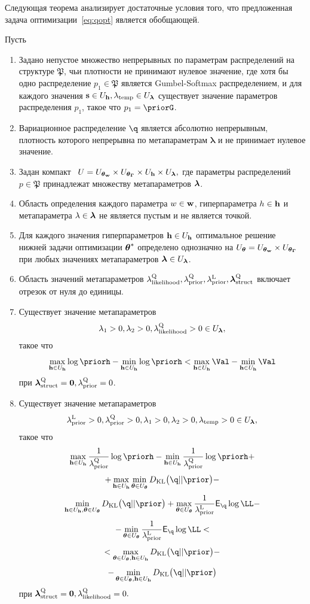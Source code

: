 Следующая теорема анализирует достаточные условия того, что предложенная задача оптимизации~\eqref{eq:qopt} является обобщающей.
\begin{theorem}
Пусть
\begin{enumerate}%
\item Задано непустое множество непрерывных по параметрам распределений на структуре $\mathfrak{P}$, чьи плотности не принимают нулевое значение, где хотя бы одно распределение $p_1 \in \mathfrak{P}$ является Gumbel-Softmax распределением, и для каждого значения $\mathbf{s} \in U_{\mathbf{h}}, \lambda_{\text{temp}} \in U_{\boldsymbol{\lambda}}$ существует значение параметров распределения $p_1$, такое что $p_1 = \priorG$.

\item Вариационное распределение $\q$ является  абсолютно непрерывным, плотность которого непрерывна по метапараметрам $\boldsymbol{\lambda}$ и не принимает нулевое значение.

\item Задан компакт  $U = U_{\boldsymbol{\theta}_\mathbf{w}} \times U_{\boldsymbol{\theta}_{\boldsymbol{\Gamma}}} \times U_{\mathbf{h}} \times U_{\boldsymbol{\lambda}},$ где параметры распределений $p \in \mathfrak{P}$ принадлежат множеству метапараметров $\boldsymbol{\lambda}$.

\item Область определения каждого параметра $w \in\mathbf{w}$, гиперпараметра $h \in \mathbf{h}$ и метапараметра $\lambda \in \boldsymbol{\lambda}$ не является пустым и не является точкой.

\item Для каждого значения гиперпараметров $\mathbf{h} \in U_{\mathbf{h}}$ оптимальное решение нижней задачи оптимизации $\boldsymbol{\theta}^{*}$ определено однозначно на $U_{\boldsymbol{\theta}} = U_{\boldsymbol{\theta}_\mathbf{w}} \times U_{\boldsymbol{\theta}_{\boldsymbol{\Gamma}}}$ при любых значениях метапараметров $\boldsymbol{\lambda} \in U_{\boldsymbol{\lambda}}$.

\item Область значений метапараметров $\lambda_\text{likelihood}^\text{Q}, \lambda_\text{prior}^\text{Q}, \lambda_\text{prior}^\text{L}, \boldsymbol{\lambda}_\text{struct}^\text{Q}$ включает отрезок от нуля до единицы.

\item Существует значение метапараметров $$\lambda_1>0, \lambda_2>0, \lambda_\text{likelihood}^\text{Q}>0  \in U_{\boldsymbol{\lambda}},$$ такое что
\[
\max_{\h \in \Uh} \log \priorh -\min_{\h \in \Uh}\log \priorh < \max_{\h \in \Uh} \Val - \min_{\h \in \Uh} \Val
\] 
при $\boldsymbol{\lambda}_\text{struct}^\text{Q} = \mathbf{0}, \lambda_\text{prior}^\text{Q} = 0$.

\item Существует значение метапараметров $$\lambda_\text{prior}^\text{L}>0, \lambda_\text{prior}^\text{Q}>0, \lambda_1>0, \lambda_2>0, \lambda_{\text{temp}}>0 \in U_{\boldsymbol{\lambda}},$$ такое что 
\[
    \max_{\h \in \Uh} \frac{1}{\lamCQ}\log  \priorh - \min_{\h \in \Uh} \frac{1}{\lamCQ}\log  \priorh +
\]
\[
 + \max_{\h \in \Uh} \min_{\teta \in \Uteta} \KL{\q}{\prior} -
\]
\[ \min_{\h \in \Uh, \teta \in \Uteta}  \KL{\q}{\prior} + \max_{\teta \in \Uteta}\frac{1}{\lamCL}\E_{\q} \log \LL - 
\]
\[
 - \min_{\teta \in \Uteta}\frac{1}{\lamCL}\E_{\q} \log \LL  <
\]
\[ 
< \max_{\teta \in \Uteta, \h \in \Uh} \KL{\q}{\prior} -
\]
\[
-\min_{\teta \in \Uteta, \h \in \Uh} \KL{\q}{\prior}
\]
при $\boldsymbol{\lambda}_\text{struct}^\text{Q} = \mathbf{0}, \lambda_\text{likelihood}^\text{Q} = 0.$


\end{enumerate}
\end{theorem}
